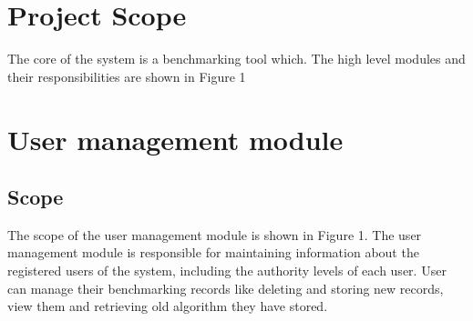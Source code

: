 \documentclass[runningheads,a4paper]{article}
\begin{document}
\section{Project Scope}
The core of the system is a benchmarking tool which. The high level modules and their responsibilities are
shown in Figure 1

\section{User management module}
\subsection{Scope}
The scope of the user management module is shown in Figure 1. The user
management module is responsible for maintaining information about the registered
users of the system, including the authority levels of each user. User can manage their benchmarking records like deleting and storing new records, view them and retrieving old algorithm they have stored.
\end{document}
